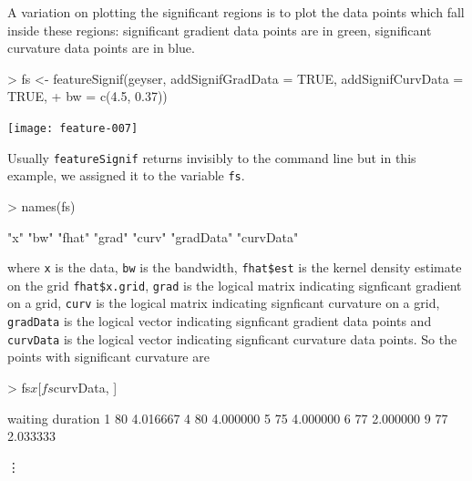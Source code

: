 \documentclass[a4paper,11pt]{article}
\begin{document}
A variation on plotting the significant regions is to plot the data points which
fall inside these regions: 
significant gradient data points are in green,  
significant curvature data points are in blue.
\begin{center}
\begin{Schunk}
\begin{Sinput}
> fs <- featureSignif(geyser, addSignifGradData = TRUE, addSignifCurvData = TRUE, 
+     bw = c(4.5, 0.37))
\end{Sinput}
\end{Schunk}
\texttt{[image: feature-007]}
\end{center}

Usually \texttt{featureSignif} returns invisibly to the command line 
but in this example, we assigned it to the variable \texttt{fs}.
\begin{Schunk}
\begin{Sinput}
> names(fs)
\end{Sinput}
\begin{Soutput}
[1] "x"        "bw"       "fhat"     "grad"     "curv"     "gradData" "curvData"
\end{Soutput}
\end{Schunk}
where \texttt{x} is the data, \texttt{bw} is the bandwidth, \texttt{fhat\$est} 
is the kernel density estimate
on the grid \texttt{fhat\$x.grid}, 
\texttt{grad} is the logical matrix indicating signficant gradient on a grid, 
\texttt{curv} is the logical matrix indicating signficant curvature on a grid,
\texttt{gradData} is the logical vector indicating signficant gradient data points and 
\texttt{curvData} is the logical vector indicating signficant curvature data points.
So the points with significant curvature are 
\begin{Schunk}
\begin{Sinput}
> fs$x[fs$curvData, ]
\end{Sinput}
\end{Schunk}
\begin{Schunk}
\begin{Soutput}
  waiting duration
1      80 4.016667
4      80 4.000000
5      75 4.000000
6      77 2.000000
9      77 2.033333
\end{Soutput}
\end{Schunk}
\vdots
\end{document}

